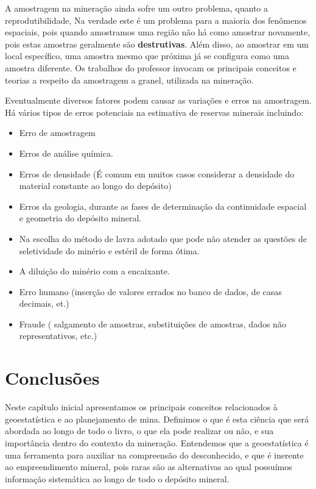 A amostragem na mineração ainda sofre um outro problema, quanto a reprodutibilidade, Na verdade este é um problema para a maioria dos fenômenos espaciais, pois quando amostramos uma região não há como amostrar novamente, pois estas amostras geralmente são \textbf{destrutivas}. Além disso, ao amostrar em um local específico, uma amostra mesmo que próxima já se configura como uma amostra diferente. Os trabalhos do professor \citet{gy2012sampling} invocam os principais conceitos e teorias a respeito da amostragem a granel, utilizada na mineração.

Eventualmente diversos fatores podem causar as variações e erros na amostragem. Há vários tipos de erros potenciais na estimativa de reservas minerais incluindo:

\begin{itemize}
	\item Erro de amostragem 
	\item Erros de análise química.
	\item Erros de densidade (É comum em muitos casos considerar a densidade do material constante ao longo do depósito)
	\item Erros da geologia, durante as fases de determinação da continuidade espacial e geometria do depósito mineral.
	\item Na escolha do método de lavra adotado que pode não atender as questões de seletividade do minério e estéril de forma ótima.
	\item A diluição do minério com a encaixante.
	\item Erro humano (inserção de valores errados no banco de dados, de casas decimais, et.)
	\item Fraude ( salgamento de amostras, substituições de amostras, dados não representativos, etc.)
	
\end{itemize}


\section{Conclusões} 

Neste capítulo inicial apresentamos os principais conceitos relacionados à geoestatística e ao planejamento de mina. Definimos o que é esta ciência que será abordada ao longo de todo o livro, o que ela pode realizar ou não, e sua importância dentro do contexto da mineração. Entendemos que a geoestatística é uma ferramenta para auxiliar na compreensão do desconhecido, e que é inerente ao empreendimento mineral, pois raras são as alternativas ao qual possuímos informação sistemática ao longo de todo o depósito mineral.


